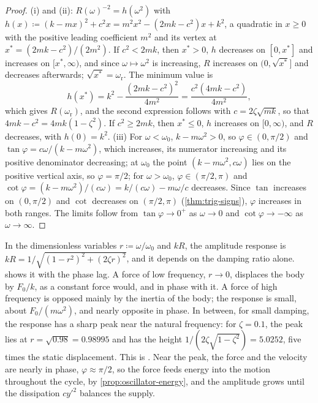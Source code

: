 \begin{proof}
(i) and (ii): $R(\omega)^{-2}=h(\omega^2)$ with $h(x)\coloneqq(k-mx)^2+c^2x=m^2x^2-(2mk-c^2)x+k^2$, a quadratic in $x\ge0$ with the positive leading coefficient $m^2$ and its vertex at $x^*=(2mk-c^2)/(2m^2)$. If $c^2<2mk$, then $x^*>0$, $h$ decreases on $[0,x^*]$ and increases on $[x^*,\infty)$, and since $\omega\mapsto\omega^2$ is increasing, $R$ increases on $(0,\sqrt{x^*}]$ and decreases afterwards; $\sqrt{x^*}=\omega_{\mathrm r}$. The minimum value is
\[
h(x^*)=k^2-\frac{(2mk-c^2)^2}{4m^2}=\frac{c^2(4mk-c^2)}{4m^2},
\]
which gives $R(\omega_{\mathrm r})$, and the second expression follows with $c=2\zeta\sqrt{mk}$, so that $4mk-c^2=4mk(1-\zeta^2)$. If $c^2\ge2mk$, then $x^*\le0$, $h$ increases on $[0,\infty)$, and $R$ decreases, with $h(0)=k^2$. (iii) For $\omega<\omega_0$, $k-m\omega^2>0$, so $\varphi\in(0,\pi/2)$ and $\tan\varphi=c\omega/(k-m\omega^2)$, which increases, its numerator increasing and its positive denominator decreasing; at $\omega_0$ the point $(k-m\omega^2,c\omega)$ lies on the positive vertical axis, so $\varphi=\pi/2$; for $\omega>\omega_0$, $\varphi\in(\pi/2,\pi)$ and $\cot\varphi=(k-m\omega^2)/(c\omega)=k/(c\omega)-m\omega/c$ decreases. Since $\tan$ increases on $(0,\pi/2)$ and $\cot$ decreases on $(\pi/2,\pi)$ (\cref{thm:trig-signs}), $\varphi$ increases in both ranges. The limits follow from $\tan\varphi\to0^+$ as $\omega\to0$ and $\cot\varphi\to-\infty$ as $\omega\to\infty$.
\end{proof}

In the dimensionless variables $r\coloneqq\omega/\omega_0$ and $kR$, the amplitude response is $kR=1/\sqrt{(1-r^2)^2+(2\zeta r)^2}$, and it depends on the damping ratio alone.  shows it with the phase lag. A force of low frequency, $r\to0$, displaces the body by $F_0/k$, as a constant force would, and in phase with it. A force of high frequency is opposed mainly by the inertia of the body; the response is small, about $F_0/(m\omega^2)$, and nearly opposite in phase. In between, for small damping, the response has a sharp peak near the natural frequency: for $\zeta=0.1$, the peak lies at $r=\sqrt{0.98}=0.98995$ and has the height $1/(2\zeta\sqrt{1-\zeta^2})=5.0252$, five times the static displacement. This is . Near the peak, the force and the velocity are nearly in phase, $\varphi\approx\pi/2$, so the force feeds energy into the motion throughout the cycle, by \cref{prop:oscillator-energy}, and the amplitude grows until the dissipation $cy'^2$ balances the supply.

